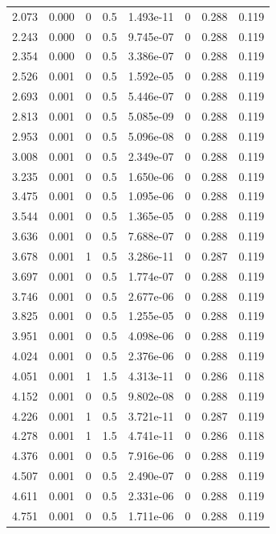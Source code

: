 \documentclass[preview]{standalone}
\begin{document}
{{\begin{tabular}{L{1.2cm}C{1.2cm} C{0.3cm}C{0.5cm} C{1.4cm}C{1.4cm} C{1.4cm}C{1.4cm}}
  2.073  &  0.000  & 0     & 0.5 &  1.493e-11  & 0  & 0.288 &  0.119   \\ 
  2.243  &  0.000  & 0     & 0.5 &  9.745e-07  & 0  & 0.288 &  0.119   \\ 
  2.354  &  0.000  & 0     & 0.5 &  3.386e-07  & 0  & 0.288 &  0.119   \\ 
  2.526  &  0.001  & 0     & 0.5 &  1.592e-05  & 0  & 0.288 &  0.119   \\ 
  2.693  &  0.001  & 0     & 0.5 &  5.446e-07  & 0  & 0.288 &  0.119   \\ 
  2.813  &  0.001  & 0     & 0.5 &  5.085e-09  & 0  & 0.288 &  0.119   \\ 
  2.953  &  0.001  & 0     & 0.5 &  5.096e-08  & 0  & 0.288 &  0.119   \\ 
  3.008  &  0.001  & 0     & 0.5 &  2.349e-07  & 0  & 0.288 &  0.119   \\ 
  3.235  &  0.001  & 0     & 0.5 &  1.650e-06  & 0  & 0.288 &  0.119   \\ 
  3.475  &  0.001  & 0     & 0.5 &  1.095e-06  & 0  & 0.288 &  0.119   \\ 
  3.544  &  0.001  & 0     & 0.5 &  1.365e-05  & 0  & 0.288 &  0.119   \\ 
  3.636  &  0.001  & 0     & 0.5 &  7.688e-07  & 0  & 0.288 &  0.119   \\ 
  3.678  &  0.001  & 1     & 0.5 &  3.286e-11  & 0  & 0.287 &  0.119   \\ 
  3.697  &  0.001  & 0     & 0.5 &  1.774e-07  & 0  & 0.288 &  0.119   \\ 
  3.746  &  0.001  & 0     & 0.5 &  2.677e-06  & 0  & 0.288 &  0.119   \\ 
  3.825  &  0.001  & 0     & 0.5 &  1.255e-05  & 0  & 0.288 &  0.119   \\ 
  3.951  &  0.001  & 0     & 0.5 &  4.098e-06  & 0  & 0.288 &  0.119   \\ 
  4.024  &  0.001  & 0     & 0.5 &  2.376e-06  & 0  & 0.288 &  0.119   \\ 
  4.051  &  0.001  & 1     & 1.5 &  4.313e-11  & 0  & 0.286 &  0.118   \\ 
  4.152  &  0.001  & 0     & 0.5 &  9.802e-08  & 0  & 0.288 &  0.119   \\ 
  4.226  &  0.001  & 1     & 0.5 &  3.721e-11  & 0  & 0.287 &  0.119   \\ 
  4.278  &  0.001  & 1     & 1.5 &  4.741e-11  & 0  & 0.286 &  0.118   \\ 
  4.376  &  0.001  & 0     & 0.5 &  7.916e-06  & 0  & 0.288 &  0.119   \\ 
  4.507  &  0.001  & 0     & 0.5 &  2.490e-07  & 0  & 0.288 &  0.119   \\ 
  4.611  &  0.001  & 0     & 0.5 &  2.331e-06  & 0  & 0.288 &  0.119   \\ 
  4.751  &  0.001  & 0     & 0.5 &  1.711e-06  & 0  & 0.288 &  0.119   \\ 
\hline 
\end{tabular} 

}}
\end{document}
